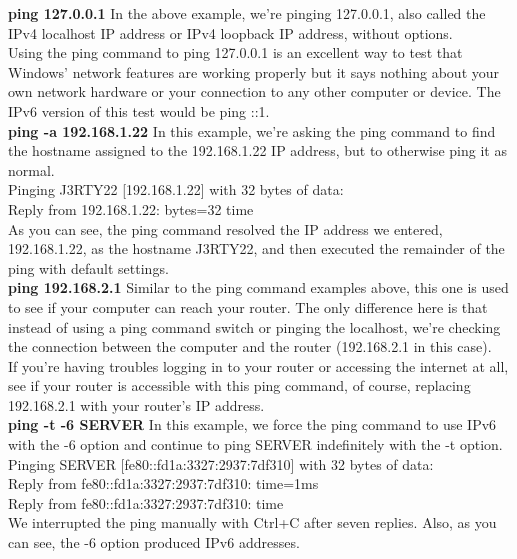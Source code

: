 \documentclass{article}
\begin{document}
\textbf{ping 127.0.0.1}
In the above example, we're pinging 127.0.0.1, also called the IPv4 localhost IP address or IPv4 loopback IP address, without options.\\

Using the ping command to ping 127.0.0.1 is an excellent way to test that Windows' network features are working properly but it says nothing about your own network hardware or your connection to any other computer or device. The IPv6 version of this test would be ping ::1.\\

\textbf{ping -a 192.168.1.22}
In this example, we're asking the ping command to find the hostname assigned to the 192.168.1.22 IP address, but to otherwise ping it as normal.\\

Pinging J3RTY22 [192.168.1.22] with 32 bytes of data:\\
Reply from 192.168.1.22: bytes=32 time\\
As you can see, the ping command resolved the IP address we entered, 192.168.1.22, as the hostname J3RTY22, and then executed the remainder of the ping with default settings.\\

\textbf{ping 192.168.2.1}
Similar to the ping command examples above, this one is used to see if your computer can reach your router. The only difference here is that instead of using a ping command switch or pinging the localhost, we're checking the connection between the computer and the router (192.168.2.1 in this case).\\

If you're having troubles logging in to your router or accessing the internet at all, see if your router is accessible with this ping command, of course, replacing 192.168.2.1 with your router's IP address.\\

\textbf{ping -t -6 SERVER}
In this example, we force the ping command to use IPv6 with the -6 option and continue to ping SERVER indefinitely with the -t option.\\

Pinging SERVER [fe80::fd1a:3327:2937:7df310] with 32 bytes of data:\\
Reply from fe80::fd1a:3327:2937:7df310: time=1ms\\
Reply from fe80::fd1a:3327:2937:7df310: time\\
We interrupted the ping manually with Ctrl+C after seven replies. Also, as you can see, the -6 option produced IPv6 addresses.
\end{document}
